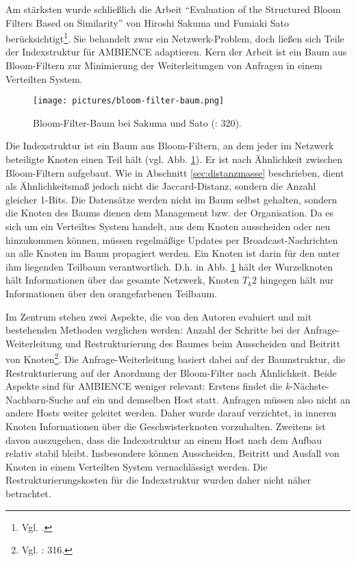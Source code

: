 Am stärksten wurde schließlich die Arbeit "`Evaluation of the Structured Bloom Filters Based on Similarity"' von Hiroshi Sakuma und Fumiaki Sato berücksichtigt\footnote{Vgl. \cite{Sakuma2011}.}. Sie behandelt zwar ein Netzwerk-Problem, doch ließen sich Teile der Indexstruktur für AMBIENCE adaptieren. Kern der Arbeit ist ein Baum aus Bloom-Filtern zur Minimierung der Weiterleitungen von Anfragen in einem Verteilten System. 
\begin{figure}[hpbt]
  \centering
  \texttt{[image: pictures/bloom-filter-baum.png]}\\
  \caption[Bloom-Filter-Baum bei Sakuma und Sato (Bildnachweis: \cite{Sakuma2011}: 320)]{Bloom-Filter-Baum bei Sakuma und Sato (\cite{Sakuma2011}: 320).}\label{fig:pic5}
\end{figure}
Die Indexstruktur ist ein Baum aus Bloom-Filtern, an dem jeder im Netzwerk beteiligte Knoten einen Teil hält (vgl. Abb. \ref{fig:pic5}). Er ist nach Ähnlichkeit zwischen Bloom-Filtern aufgebaut. Wie in Abschnitt \ref{sec:distanzmasse} beschrieben, dient als Ähnlichkeitsmaß jedoch nicht die Jaccard-Distanz, sondern die Anzahl gleicher 1-Bits. Die Datensätze werden nicht im Baum selbst gehalten, sondern die Knoten des Baums dienen dem Management bzw. der Organisation. Da es sich um ein Verteiltes System handelt, aus dem Knoten ausscheiden oder neu hinzukommen können, müssen regelmäßige Updates per Broadcast-Nachrichten an alle Knoten im Baum propagiert werden. Ein Knoten ist darin für den unter ihm liegenden Teilbaum verantwortlich. D.h. in Abb. \ref{fig:pic5} hält der Wurzelknoten hält Informationen über das gesamte Netzwerk, Knoten $T_k2$ hingegen hält nur Informationen über den orangefarbenen Teilbaum. 

Im Zentrum stehen zwei Aspekte, die von den Autoren evaluiert und mit bestehenden Methoden verglichen werden: Anzahl der Schritte bei der Anfrage-Weiterleitung und Restrukturierung des Baumes beim Ausscheiden und Beitritt von Knoten\footnote{Vgl. \cite{Sakuma2011}: 316.}. Die Anfrage-Weiterleitung basiert dabei auf der Baumstruktur, die Restrukturierung auf der Anordnung der Bloom-Filter nach Ähnlichkeit. Beide Aspekte sind für AMBIENCE weniger relevant: Erstens findet die \textit{k}-Nächste-Nachbarn-Suche auf ein und demselben Host statt. Anfragen müssen also nicht an andere Hosts weiter geleitet werden. Daher wurde darauf verzichtet, in inneren Knoten Informationen über die Geschwisterknoten vorzuhalten. Zweitens ist davon auszugehen, dass die Indexstruktur an einem Host nach dem Aufbau relativ stabil bleibt. Insbesondere können Ausscheiden, Beitritt und Ausfall von Knoten in einem Verteilten System vernachlässigt werden. Die Restrukturierungskosten für die Indexstruktur wurden daher nicht näher betrachtet.  

